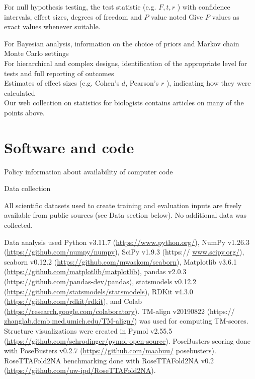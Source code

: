 \documentclass[10pt]{article}
\begin{document}
For null hypothesis testing, the test statistic (e.g. $F, t, r$ ) with confidence intervals, effect sizes, degrees of freedom and $P$ value noted Give $P$ values as exact values whenever suitable.

For Bayesian analysis, information on the choice of priors and Markov chain Monte Carlo settings\\
For hierarchical and complex designs, identification of the appropriate level for tests and full reporting of outcomes\\
Estimates of effect sizes (e.g. Cohen's $d$, Pearson's $r$ ), indicating how they were calculated\\
Our web collection on statistics for biologists contains articles on many of the points above.

\section*{Software and code}
Policy information about availability of computer code

Data collection

All scientific datasets used to create training and evaluation inputs are freely available from public sources (see Data section below). No additional data was collected.

Data analysis used Python v3.11.7 (\href{https://www.python.org/}{https://www.python.org/}), NumPy v1.26.3 (\href{https://github.com/numpy/numpy}{https://github.com/numpy/numpy}), SciPy v1.9.3 (https:// \href{http://www.scipy.org/}{www.scipy.org/}), seaborn v0.12.2 (\href{https://github.com/mwaskom/seaborn}{https://github.com/mwaskom/seaborn}), Matplotlib v3.6.1 (\href{https://github.com/matplotlib/matplotlib}{https://github.com/matplotlib/matplotlib}), pandas v2.0.3 (\href{https://github.com/pandas-dev/pandas}{https://github.com/pandas-dev/pandas}), statsmodels v0.12.2 (\href{https://github.com/statsmodels/statsmodels}{https://github.com/statsmodels/statsmodels}), RDKit v4.3.0 (\href{https://github.com/rdkit/rdkit}{https://github.com/rdkit/rdkit}), and Colab (\href{https://research.google.com/colaboratory}{https://research.google.com/colaboratory}). TM-align v20190822 (https:// \href{http://zhanglab.dcmb.med.umich.edu/TM-align/}{zhanglab.dcmb.med.umich.edu/TM-align/}) was used for computing TM-scores. Structure visualizations were created in Pymol v2.55.5 (\href{https://github.com/schrodinger/pymol-open-source}{https://github.com/schrodinger/pymol-open-source}). PoseBusters scoring done with PoseBusters v0.2.7 (\href{https://github.com/maabuu/}{https://github.com/maabuu/} posebusters). RoseTTAFold2NA benchmarking done with RoseTTAFold2NA v0.2 (\href{https://github.com/uw-ipd/RoseTTAFold2NA}{https://github.com/uw-ipd/RoseTTAFold2NA}).
\end{document}
